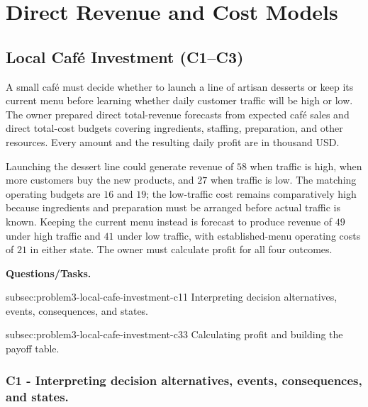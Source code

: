 	\section{Direct Revenue and Cost Models}
	\label{sec:direct-revenue-cost-models}


	\subsection{Local Café Investment (C1--C3)}
	\label{sec:problem3-local-cafe-investment-c1-c3}

	A small café must decide whether to launch a line of artisan desserts or keep its current menu before learning whether daily customer traffic will be high or low. The owner prepared direct total-revenue forecasts from expected café sales and direct total-cost budgets covering ingredients, staffing, preparation, and other resources. Every amount and the resulting daily profit are in thousand USD.

	Launching the dessert line could generate revenue of \(58\) when traffic is high, when more customers buy the new products, and \(27\) when traffic is low. The matching operating budgets are \(16\) and \(19\); the low-traffic cost remains comparatively high because ingredients and preparation must be arranged before actual traffic is known. Keeping the current menu instead is forecast to produce revenue of \(49\) under high traffic and \(41\) under low traffic, with established-menu operating costs of \(21\) in either state. The owner must calculate profit for all four outcomes.

	\textbf{Questions/Tasks.}
	\begin{enumerate}
		\CriterionTask
		{subsec:problem3-local-cafe-investment-c1}{1}
		{Interpreting decision alternatives, events, consequences, and states.}

		\CriterionTask
		{subsec:problem3-local-cafe-investment-c3}{3}
		{Calculating profit and building the payoff table.}
	\end{enumerate}

	\subsubsection*{C1 - Interpreting decision alternatives, events, consequences, and states.}
	\label{subsec:problem3-local-cafe-investment-c1}

